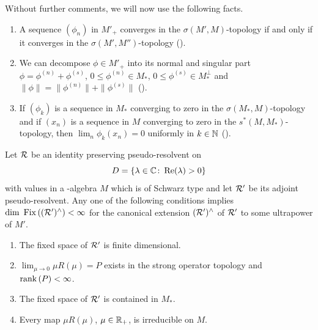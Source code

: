 \begin{remark}\label{rem:d4-remark}
Without further comments, we will now use the following facts.
\begin{enumerate}[\upshape(i), wide, labelindent=.25em]
\item\label{rem:item1}
A sequence $ (\phi_{n}) $  in $ M'_{+} $  converges in the $ \sigma(M',M) $-topology if and only if it converges in the $ \sigma(M',M'') $-topology (\textcite{akemann:1972}).

\item\label{rem:item2}
We can decompose $ \phi \in M'_{+} $  into its normal and singular part $ \phi = \phi^{(n)} + \phi^{(s)} $, $ 0 \leq \phi^{(n)} \in M_{*} $, $ 0 \leq \phi^{(s)} \in M_*^{\perp} $  and $ \|\phi\| = \|\phi^{(n)}\| + \|\phi^{(s)}\| $  (\textcite[Theorem III.2.14]{takesaki:1979}).

\item\label{rem:item3}
If\/ $ (\phi_{k}) $  is a sequence in $ M_{*} $  converging to zero in the $ \sigma(M_{*},M) $-topology and if\/ $ (x_{n}) $  is a sequence in $ M $  converging to zero in the $ s^{*}(M,M_{*}) $-topology, then $ \lim_{n} \phi_{k}(x_{n}) = 0 $  uniformly in $ k \in \mathbb{N} $  (\textcite[Lemma III.5.5]{takesaki:1979}).
\end{enumerate}
\end{remark}
\begin{theorem}\label{thm:d4-4.4}
Let $ \mathcal{R} $  be an identity preserving pseudo-resolvent on 
%
\[
	D = \{\lambda \in \mathbb{C} \colon  \mathop{}\!\mathrm{Re}(\lambda) > 0\} 
\]
%
with values in a \WA-algebra $ M $  which is of Schwarz type and let $ \mathcal{R}' $  be its adjoint pseudo-resolvent.
Any one of the following conditions implies $ \mathop{}\!\mathrm{dim}\, \mathop{}\mathrm{Fix}\left((\mathcal{R}')^{\wedge}\right) < \infty $  for the canonical extension $ (\mathcal{R}')^{\wedge} $  of\/ $ \mathcal{R}' $  to some ultrapower of\/ $ M' $.
\begin{enumerate}[\upshape (i)]
\item
The fixed space of\/ $ \mathcal{R}' $  is finite dimensional.

\item
$ \lim_{\mu \to 0} \mu R(\mu) = P $  exists in the strong operator topology and $ \mathop{}\!\mathrm{rank}\, (P) < \infty $.

\item
The fixed space of\/ $ \mathcal{R}' $  is contained in $ M_{*} $.

\item
Every map $ \mu R(\mu) $, $ \mu \in \mathbb{R}_{+} $, is irreducible on $ M $.
\end{enumerate}
\end{theorem}
